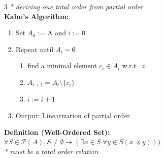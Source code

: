 \documentclass[10pt,landscape]{article}
\begin{document}
\begin{multicols}{3}
    \textit{* deriving one total order from partial order} \\
    \textbf{Kahn's Algorithm:} \\
    \begin{enumerate}
        \item Set $A_0$ := A and $i := 0$
        \item Repeat until $A_i = \emptyset$
              \begin{enumerate}
                  \item find a minimal element $c_i \in A_i$ w.r.t $\preceq$
                  \item $A_{i+1} = A_i \setminus \{c_i\}$
                  \item $i := i + 1$
              \end{enumerate}
        \item Output: Linearization of partial order
    \end{enumerate}
    \textbf{Definition (Well-Ordered Set):} \\
    $\forall S \in \mathcal{P}(A), S \neq \emptyset \rightarrow (\exists x \in S \;\forall y \in S (x \preceq y)))$ \\
    \textit{* must be a total order relation}

\end{multicols}
\newpage
\end{document}
